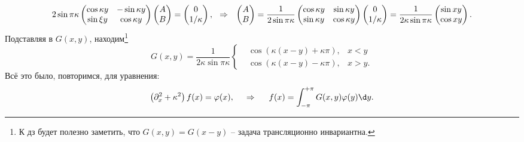 \begin{equation*}
    2 \sin \pi \kappa 
    \begin{pmatrix}
        \cos \kappa y & - \sin \kappa y  \\
        \sin \xi y & \cos \kappa y  \\
    \end{pmatrix} \begin{pmatrix}
        A  \\
        B  \\
    \end{pmatrix}
    = \begin{pmatrix}
        0 \\ 1/\kappa
    \end{pmatrix},
    \hspace{0.25cm} \Rightarrow \hspace{0.25cm}
    \begin{pmatrix}
        A \\ B
    \end{pmatrix} = 
    \frac{1}{2 \sin \pi \kappa} \begin{pmatrix}
        \cos \kappa y & \sin \kappa y  \\
        \sin \kappa y & \cos \kappa y  \\
    \end{pmatrix}
    \begin{pmatrix}
        0 \\ 1/\kappa
    \end{pmatrix} = 
    \frac{1}{2 \kappa \sin \pi \kappa} \begin{pmatrix}
        \sin xy \\ \cos xy
    \end{pmatrix}.
\end{equation*}
Подставляя в $G(x, y)$, находим\footnote{
    К дз будет полезно заметить, что $G(x, y) = G(x-y)$ -- задача трансляционно инвариантна. 
} 
\begin{equation*}
    G(x, y) = \frac{1}{2 \kappa \sin \pi \kappa}
    \left\{\begin{aligned}
        &\cos \left(\kappa(x-y) + \kappa \pi\right), & x < y\\
        &\cos(\kappa (x-y) - \kappa \pi), & x > y.
    \end{aligned}\right.
\end{equation*}
Всё это было, повторимся, для уравнения:
\begin{equation*}
    \left(\partial_x^2 + \kappa^2\right) f(x) = \varphi(x),
    \hspace{0.5cm} \Rightarrow \hspace{0.5cm}   
    f(x) = 
    \int_{-\pi}^{+\pi} G(x, y) \varphi(y) \d y. 
\end{equation*}





